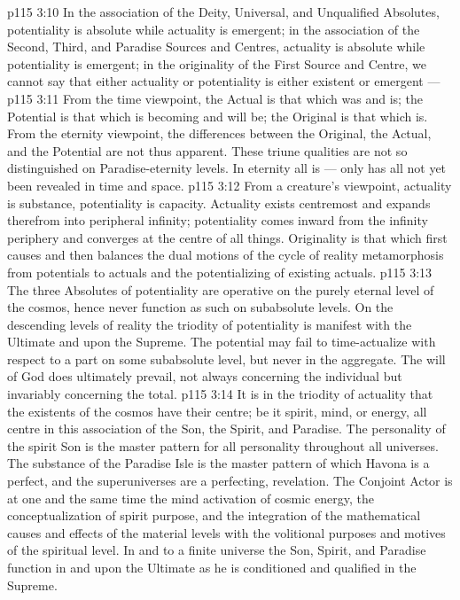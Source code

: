 \vs p115 3:10 In the association of the Deity, Universal, and Unqualified Absolutes, potentiality is absolute while actuality is emergent; in the association of the Second, Third, and Paradise Sources and Centres, actuality is absolute while potentiality is emergent; in the originality of the First Source and Centre, we cannot say that either actuality or potentiality is either existent or emergent --- 
\vs p115 3:11 From the time viewpoint, the Actual is that which was and is; the Potential is that which is becoming and will be; the Original is that which is. From the eternity viewpoint, the differences between the Original, the Actual, and the Potential are not thus apparent. These triune qualities are not so distinguished on Paradise\hyp{}eternity levels. In eternity all is --- only has all not yet been revealed in time and space.
\vs p115 3:12 From a creature’s viewpoint, actuality is substance, potentiality is capacity. Actuality exists centremost and expands therefrom into peripheral infinity; potentiality comes inward from the infinity periphery and converges at the centre of all things. Originality is that which first causes and then balances the dual motions of the cycle of reality metamorphosis from potentials to actuals and the potentializing of existing actuals.
\vs p115 3:13 The three Absolutes of potentiality are operative on the purely eternal level of the cosmos, hence never function as such on subabsolute levels. On the descending levels of reality the triodity of potentiality is manifest with the Ultimate and upon the Supreme. The potential may fail to time\hyp{}actualize with respect to a part on some subabsolute level, but never in the aggregate. The will of God does ultimately prevail, not always concerning the individual but invariably concerning the total.
\vs p115 3:14 It is in the triodity of actuality that the existents of the cosmos have their centre; be it spirit, mind, or energy, all centre in this association of the Son, the Spirit, and Paradise. The personality of the spirit Son is the master pattern for all personality throughout all universes. The substance of the Paradise Isle is the master pattern of which Havona is a perfect, and the superuniverses are a perfecting, revelation. The Conjoint Actor is at one and the same time the mind activation of cosmic energy, the conceptualization of spirit purpose, and the integration of the mathematical causes and effects of the material levels with the volitional purposes and motives of the spiritual level. In and to a finite universe the Son, Spirit, and Paradise function in and upon the Ultimate as he is conditioned and qualified in the Supreme.
